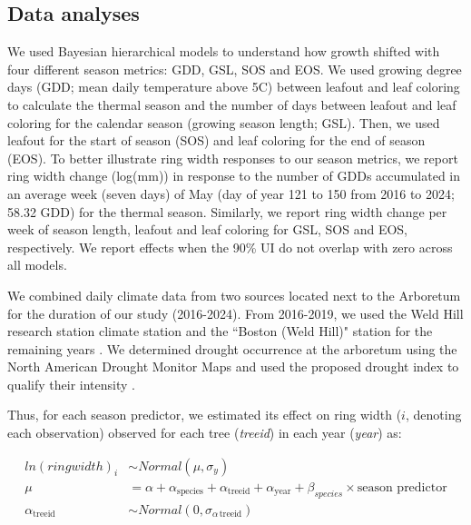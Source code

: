 \documentclass{article}\usepackage[]{graphicx}\usepackage[]{xcolor}
\begin{document}
\subsection{Data analyses}
We used Bayesian hierarchical models to understand how growth shifted with four different season metrics: GDD, GSL, SOS and EOS. We used growing degree days (GDD; mean daily temperature above 5\degree C) between leafout and leaf coloring to calculate the thermal season and the number of days between leafout and leaf coloring for the calendar season (growing season length; GSL). Then, we used leafout for the start of season (SOS) and leaf coloring for the end of season (EOS). To better illustrate ring width responses to our season metrics, we report ring width change (log(mm)) in response to the number of GDDs accumulated in an average week (seven days) of May (day of year 121 to 150 from 2016 to 2024; 58.32 GDD) for the thermal season. Similarly, we report ring width change per week of season length, leafout and leaf coloring for GSL, SOS and EOS, respectively. We report effects when the 90\% UI do not overlap with zero across all models.

We combined daily climate data from two sources located next to the Arboretum for the duration of our study (2016-2024). From 2016-2019, we used the Weld Hill research station climate station \citep{arnoldarboretum_weather_2026} and the ``Boston (Weld Hill)" station for the remaining years \citep[2020-2024;][]{carroll_network_2026}. We determined drought occurrence at the arboretum using the North American Drought Monitor Maps and used the proposed drought index to qualify their intensity \citep{nationalcentersforenvironmentalinformationncei_north_2026}. 

Thus, for each season predictor, we estimated its effect on ring width ($i$, denoting each observation) observed for each tree (\textit{treeid}) in each year (\textit{year}) as:

\begin{equation}
\begin{aligned} 
ln(ringwidth)_i &\sim Normal(\mu, \sigma_y) \\
\mu &= \alpha + \alpha_{\text{species}} + \alpha_{\text{treeid}} + \alpha_{\text{year}} + \beta_{species} \times \text{season predictor} \\
\alpha_{\text{treeid}} &\sim Normal(0, \sigma_{\alpha \, \text{treeid}}) \\
\end{aligned}
\label{eq:mainMdl}
\end{equation}
\end{document}
